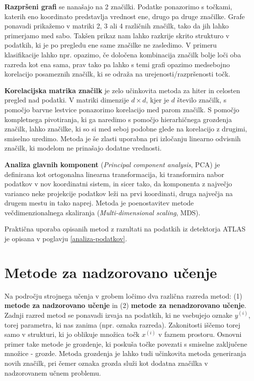 \documentclass[11pt,a4paper,openany]{book}
\begin{document}
\textbf{Razpršeni grafi} se nanašajo na 2 značilki. Podatke ponazorimo s točkami, katerih eno koordinato predstavlja vrednost ene, drugo pa druge značilke. Grafe ponavadi prikažemo v matriki 2, 3 ali 4 različnih značilk, tako da jih lahko primerjamo med sabo. Takšen prikaz nam lahko razkrije skrito strukturo v podatkih, ki je po pregledu ene same značilke ne zasledimo. V primeru klasifikacije lahko npr. opazimo, če določena kombinacija značilk bolje loči oba razreda kot ena sama, prav tako pa lahko s temi grafi opazimo medsebojno korelacijo posameznih značilk, ki se odraža na urejenosti/razpršenosti točk.

\textbf{Korelacijska matrika značilk} je zelo učinkovita metoda za hiter in celosten pregled nad podatki. V matriki dimenzije $d \times d$, kjer je $d$ število značilk, s pomočjo barvne lestvice ponazorimo korelacijo med parom značilk. S pomočjo kompletnega pivotiranja, ki ga naredimo s pomočjo hierarhičnega grozdenja značilk, lahko značilke, ki so si med seboj podobne glede na korelacijo z drugimi, smiselno uredimo. Metoda je še zlasti uporabna pri izločanju linearno odvisnih značilk, ki modelom ne prinašajo dodatne vrednosti. 

\textbf{Analiza glavnih komponent} (\textit{Principal component analysis}, PCA) je definirana kot ortogonalna linearna transformacija, ki transformira nabor podatkov v nov koordinatni sistem, in sicer tako, da komponenta z največjo varianco neke projekcije podatkov leži na prvi koordinati, druga največja na drugem mestu in tako naprej. Metoda je poenostavitev metode večdimenzionalnega skaliranja (\textit{Multi-dimensional scaling}, MDS).

Praktična uporaba opisanih metod z razultati na podatkih iz detektorja ATLAS je opisana v poglavju \ref{analiza-podatkov}.

\section{Metode za nadzorovano učenje}

Na področju strojnega učenja v grobem ločimo dva različna razreda metod: (1) \textbf{metode za nadzorovano učenje} in (2) \textbf{metode za nenadzorovano učenje}. Zadnji razred metod se ponavadi izvaja na podatkih, ki ne vsebujejo oznake $y^{(i)}$, torej parametra, ki nas zanima (npr. oznaka razreda). Zakonitosti iščemo torej samo v strukturi, ki jo oblikuje množica točk $x^{(i)}$ v faznem prostoru. Osnovni primer take metode je grozdenje, ki poskuša točke povezati s smiselne zaključene množice - grozde. Metoda grozdenja je lahko tudi učinkovita metoda generiranja novih značilk, pri čemer oznaka grozda služi kot dodatna značilka v nadzorovanem učnem problemu.
\end{document}
